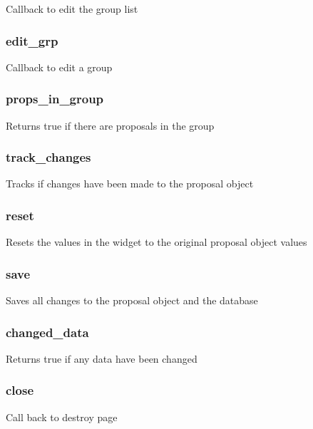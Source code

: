 \documentclass{article}
\begin{document}
Callback to edit the group list

\subsubsection*{edit\_grp\label{MkGroup_edit_grp}}


Callback to edit a group

\subsubsection*{props\_in\_group\label{MkGroup_props_in_group}}


Returns true if there are proposals in the group

\subsubsection*{track\_changes\label{MkGroup_track_changes}}


Tracks if changes have been made to the proposal object

\subsubsection*{reset\label{MkGroup_reset}}


Resets the values in the widget to the original proposal object values

\subsubsection*{save\label{MkGroup_save}}


Saves all changes to the proposal object and the database

\subsubsection*{changed\_data\label{MkGroup_changed_data}}


Returns true if any data have been changed

\subsubsection*{close\label{MkGroup_close}}


Call back to destroy page
\end{document}
